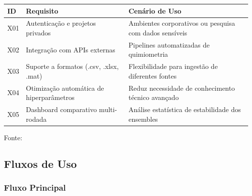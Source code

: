 \begin{quadro}[ht]
\begin{center}
\small
\captionsetup{justification=centering, labelsep=endash, width=0.75\linewidth}
\caption{Requisitos extras para fases futuras}
\label{quadro:extras}
\begin{threeparttable}
\begin{tabularx}{\textwidth}{|l|X|X|} \hline
\textbf{ID} & \textbf{Requisito} & \textbf{Cenário de Uso} \\ \hline
X01 & Autenticação e projetos privados & Ambientes corporativos ou pesquisa com dados sensíveis \\ \hline
X02 & Integração com APIs externas & Pipelines automatizadas de quimiometria \\ \hline
X03 & Suporte a formatos (.csv, .xlsx, .mat) & Flexibilidade para ingestão de diferentes fontes \\ \hline
X04 & Otimização automática de hiperparâmetros & Reduz necessidade de conhecimento técnico avançado \\ \hline
X05 & Dashboard comparativo multi-rodada & Análise estatística de estabilidade dos ensembles \\ \hline
\end{tabularx}
\begin{tablenotes}[flushleft]
\footnotesize
\item Fonte:~\oautor
\end{tablenotes}
\end{threeparttable}
\end{center}
\end{quadro}

\newpage
\subsection{Fluxos de Uso}
\label{subsec:fluxos}

\subsubsection{Fluxo Principal}
\label{ssubsec:fluxo-principal}

